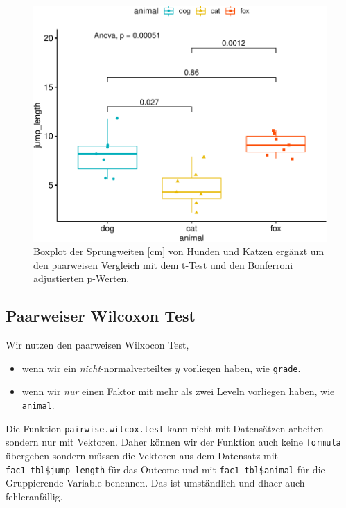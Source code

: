 \documentclass[
  letterpaper,
  DIV=11,
  oneside]{scrreport}
\providecommand{\tightlist}{%
  \setlength{\itemsep}{0pt}\setlength{\parskip}{0pt}}\usepackage{longtable,booktabs,array}
\begin{document}
\begin{figure}[H]

{\centering \includegraphics{./stat-tests-posthoc_files/figure-pdf/fig-ggpubr-1-1.pdf}

}

\caption{\label{fig-ggpubr-1}Boxplot der Sprungweiten {[}cm{]} von
Hunden und Katzen ergänzt um den paarweisen Vergleich mit dem t-Test und
den Bonferroni adjustierten p-Werten.}

\end{figure}

\hypertarget{paarweiser-wilcoxon-test}{%
\subsection{Paarweiser Wilcoxon Test}\label{paarweiser-wilcoxon-test}}

Wir nutzen den paarweisen Wilxocon Test,

\begin{itemize}
\tightlist
\item
  wenn wir ein \emph{nicht}-normalverteiltes \(y\) vorliegen haben, wie
  \texttt{grade}.
\item
  wenn wir \emph{nur} einen Faktor mit mehr als zwei Leveln vorliegen
  haben, wie \texttt{animal}.
\end{itemize}

Die Funktion \texttt{pairwise.wilcox.test} kann nicht mit Datensätzen
arbeiten sondern nur mit Vektoren. Daher können wir der Funktion auch
keine \texttt{formula} übergeben sondern müssen die Vektoren aus dem
Datensatz mit \texttt{fac1\_tbl\$jump\_length} für das Outcome und mit
\texttt{fac1\_tbl\$animal} für die Gruppierende Variable benennen. Das
ist umständlich und dhaer auch fehleranfällig.
\end{document}
